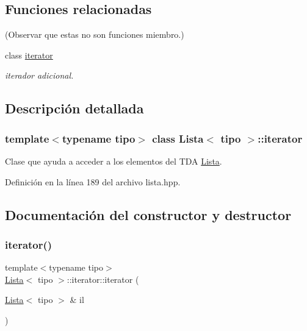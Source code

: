 \subsection*{Funciones relacionadas}
(Observar que estas no son funciones miembro.) \begin{DoxyCompactItemize}
\item 
\mbox{\label{classLista_1_1iterator_a67171474c4da6cc8efe0c7fafefd2b2d}} 
class \hyperlink{classLista_1_1iterator_a67171474c4da6cc8efe0c7fafefd2b2d}{iterator}
\begin{DoxyCompactList}\small\item\em iterador adicional. \end{DoxyCompactList}\end{DoxyCompactItemize}


\subsection{Descripción detallada}
\subsubsection*{template$<$typename tipo$>$\newline
class Lista$<$ tipo $>$\+::iterator}

Clase que ayuda a acceder a los elementos del T\+DA \hyperlink{classLista}{Lista}. 

Definición en la línea 189 del archivo lista.\+hpp.



\subsection{Documentación del constructor y destructor}
\mbox{\label{classLista_1_1iterator_a1535d6055cf70a60518be63c0f62cc1d}} 
\subsubsection{\texorpdfstring{iterator()}{iterator()}\hspace{0.1cm}{\footnotesize\ttfamily [1/2]}}
{\footnotesize\ttfamily template$<$typename tipo$>$ \\
\hyperlink{classLista}{Lista}$<$ tipo $>$\+::iterator\+::iterator (\begin{DoxyParamCaption}\item[{\hyperlink{classLista}{Lista}$<$ tipo $>$ \&}]{il }\end{DoxyParamCaption})\hspace{0.3cm}{\ttfamily [inline]}}



